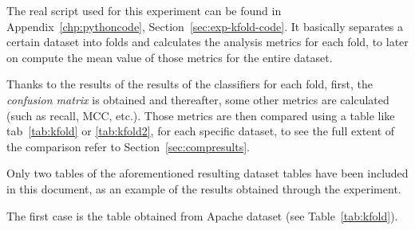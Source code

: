 The real script used for this experiment can be found in 
Appendix~\ref{chp:pythoncode}, Section~\ref{sec:exp-kfold-code}. It basically
separates a certain dataset into folds and calculates the analysis metrics
for each fold, to later on compute the mean value of those metrics for the
entire dataset.

Thanks to the results of the results of the classifiers for each fold, first,
the \textit{confusion matrix} is obtained and thereafter, some other metrics 
are calculated (such as recall, MCC, etc.). Those metrics are then compared 
using a table like tab~\ref{tab:kfold} or \ref{tab:kfold2}, for each specific
dataset, to see the full extent of the comparison refer to 
Section~\ref{sec:compresults}.

Only two tables of the aforementioned resulting dataset tables have been 
included in this document, as an example of the results obtained through the
experiment.

The first case is the table obtained from Apache dataset (see 
Table~\ref{tab:kfold}).

